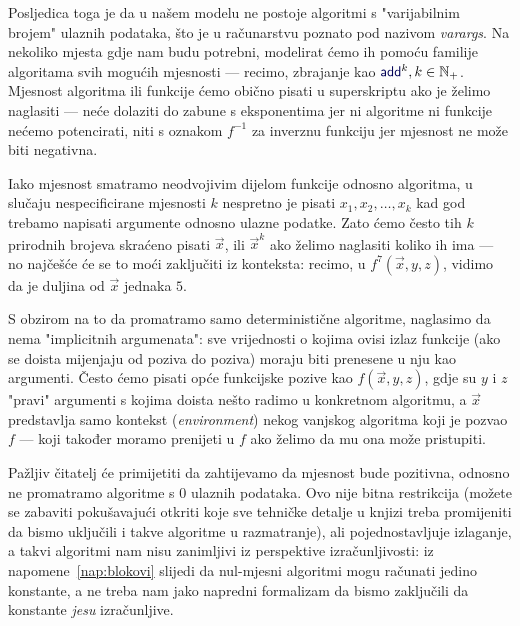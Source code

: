 Posljedica toga je da u našem modelu ne postoje algoritmi s "varijabilnim brojem" ulaznih podataka, što je u računarstvu poznato pod nazivom \emph{varargs}. Na nekoliko mjesta gdje nam budu potrebni, modelirat ćemo ih pomoću familije algoritama svih mogućih mjesnosti --- recimo, zbrajanje kao $\f{add}^k,k\in\N_+$. Mjesnost algoritma ili funkcije ćemo obično pisati u superskriptu ako je želimo naglasiti --- neće dolaziti do zabune s eksponentima jer ni algoritme ni funkcije nećemo potencirati, niti s oznakom $f^{-1}$ za inverznu funkciju jer mjesnost ne može biti negativna.

Iako mjesnost smatramo neodvojivim dijelom funkcije odnosno algoritma, u slučaju nespecificirane mjesnosti $k$ nespretno je pisati $x_1,x_2,\dotsc,x_k$ kad god trebamo napisati argumente odnosno ulazne podatke. Zato ćemo često tih $k$ prirodnih brojeva skraćeno pisati $\vec x$, ili $\vec x^k$ ako želimo naglasiti koliko ih ima --- no najčešće će se to moći zaključiti iz konteksta: recimo, u $f^7(\vec x,y,z)$, vidimo da je duljina od $\vec x$ jednaka $5$.

\begin{napomena}[{name=[svi argumenti moraju biti eksplicitno navedeni]}]\label{nap:blokovi}
S obzirom na to da promatramo samo deterministične algoritme, naglasimo da nema "implicitnih argumenata": sve vrijednosti o kojima ovisi izlaz funkcije (ako se doista mijenjaju od poziva do poziva) moraju biti prenesene u nju kao argumenti. Često ćemo pisati opće funkcijske pozive kao $f(\vec x,y,z)$, gdje su $y$ i $z$ "pravi" argumenti s kojima doista nešto radimo u konkretnom algoritmu, a $\vec x$ predstavlja samo kontekst (\hspace{-1pt}\emph{environment}) nekog vanjskog algoritma koji je pozvao $f$ --- koji također moramo prenijeti u $f$ ako želimo da mu ona može pristupiti.
\end{napomena}

Pažljiv čitatelj će primijetiti da zahtijevamo da mjesnost bude pozitivna, odnosno ne promatramo algoritme s $0$ ulaznih podataka. Ovo nije bitna restrikcija (možete se zabaviti pokušavajući otkriti koje sve tehničke detalje u knjizi treba promijeniti da bismo uključili i takve algoritme u razmatranje), ali pojednostavljuje izlaganje, a takvi algoritmi nam nisu zanimljivi iz perspektive izračunljivosti: iz napomene~\ref{nap:blokovi} slijedi da nul-mjesni algoritmi mogu računati jedino konstante, a ne treba nam jako napredni formalizam da bismo zaključili da konstante \emph{jesu} izračunljive.

